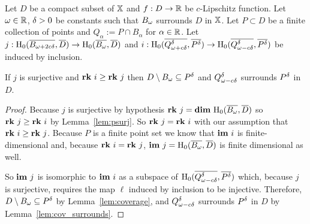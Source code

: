 \begin{theorem}\label{thm:geo_tcc}
  Let $D$ be a compact subset of $\X$ and $f : D\to\R$ be $c$-Lipschitz function.
  Let $\omega\in\R$, $\of > 0$ be constants such that $\B$ surrounds $D$ in $\X$.
  Let $P\subset D$ be a finite collection of points and $Q_\alpha := P\cap B_\alpha$ for $\alpha\in\R$.
  Let $j : \hom_0(\cmp{\BB},\cmp{D})\to \hom_0(\cmp{\B},\cmp{D})$ and $i : \hom_0(\cmp{\QQ^\of}, \cmp{\P})\to \hom_0(\cmp{\Q^\of}, \cmp{\P})$ be induced by inclusion.

  If $j$ is surjective and $\rk~i\geq \rk~j$ then $D\setminus \B\subseteq \P$ and $\Q^\of$ surrounds $\P$ in $D$.
\end{theorem}
\begin{proof}
  Because $j$ is surjective by hypothesis $\rk~j = \dim~\hom_0(\cmp{\B},\cmp{D})$ so $\rk~j\geq \rk~i$ by Lemma~\ref{lem:psurj}.
  So $\rk~j = \rk~i$ with our assumption that $\rk~i\geq \rk~j$.
  Because $P$ is a finite point set we know that $\im~i$ is finite-dimensional and, because $\rk~i = \rk~j$, $\im~j=\hom_0(\cmp{\B}, \cmp{D})$ is finite dimensional as well.
  
  So $\im~j$ is isomorphic to $\im~i$ as a subspace of $\hom_0(\cmp{\Q^\of}, \cmp{\P})$ which, because $j$ is surjective, requires the map $\ell$ induced by inclusion to be injective.
  Therefore, $D\setminus\bb\subseteq \P$ by Lemma~\ref{lem:coverage}, and $\Q^\of$ surrounds $\P$ in $D$ by Lemma~\ref{lem:cov_surrounds}.
\end{proof}
